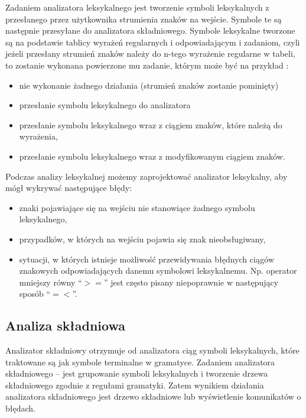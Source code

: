 Zadaniem analizatora leksykalnego jest tworzenie symboli leksykalnych 
z przesłanego przez użytkownika strumienia znaków na wejście. 
Symbole te są następnie przesyłane  do analizatora składniowego. 
Symbole leksykalne tworzone są na podstawie tablicy wyrażeń regularnych i odpowiadającym i zadaniom,
czyli jeżeli przesłany strumień znaków należy do  n-tego wyrażenie regularne w tabeli, 
 to zostanie wykonana powierzone mu zadanie, 
 którym  może być na przykład \cite{aho}:
\begin{itemize}
 \item nie wykonanie żadnego działania (strumień znaków zostanie pominięty)
 \item przesłanie symbolu leksykalnego do analizatora
 \item przesłanie symbolu leksykalnego wraz z ciągiem znaków, które należą do wyrażenia,
 \item przesłanie symbolu leksykalnego wraz z modyfikowanym ciągiem znaków.
\end{itemize}

Podczas analizy leksykalnej możemy zaprojektować analizator leksykalny, aby mógł wykrywać następujące błędy:
\begin{itemize}
 \item  znaki pojawiające się na wejściu nie stanowiące żadnego symbolu leksykalnego,
 \item  przypadków, w których na wejściu pojawia się znak nieobsługiwany,
 \item  sytuacji, w których istnieje możliwość przewidywania błędnych ciągów znakowych odpowiadających danemu symbolowi leksykalnemu.
        Np. operator mniejszy równy \textquotedblleft$>=$\textquotedblright 
        jest często pisany niepoprawnie w następujący sposób \textquotedblleft$=<$\textquotedblright.
\end{itemize}

\subsection{Analiza składniowa} \label{p_skladniowa}


Analizator składniowy otrzymuje od analizatora ciąg symboli leksykalnych,
 które traktowane są jak symbole terminalne w gramatyce. Zadaniem analizatora składniowego --
 jest grupowanie symboli leksykalnych i tworzenie drzewa składniowego zgodnie
 z regułami gramatyki. 
 Zatem wynikiem działania analizatora składniowego jest drzewo składniowe lub wyświetlenie komunikatów o błędach.

